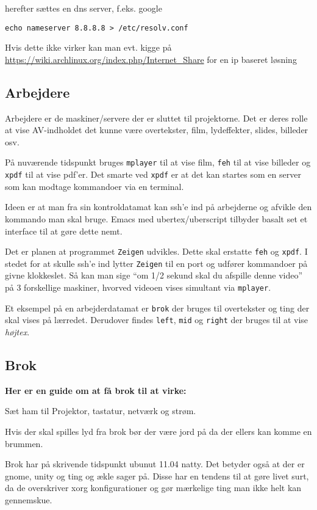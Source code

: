 \documentclass[10pt,a4paper,danish]{article}
\begin{document}
herefter sættes en dns server, f.eks. google
\begin{verbatim}
echo nameserver 8.8.8.8 > /etc/resolv.conf
\end{verbatim}

Hvis dette ikke virker kan man evt. kigge på
\url{https://wiki.archlinux.org/index.php/Internet_Share} for en ip baseret løsning


\subsection{Arbejdere}
Arbejdere er de maskiner/servere der er sluttet til projektorne. Det er deres
rolle at vise AV-indholdet det kunne være overtekster, film, lydeffekter,
slides, billeder osv.

På nuværende tidspunkt bruges \texttt{mplayer} til at vise film, \texttt{feh}
til at vise billeder og \texttt{xpdf} til at vise pdf'er.
Det smarte ved \texttt{xpdf} er at det kan startes som en server som kan modtage
kommandoer via en terminal.

Ideen er at man fra sin kontroldatamat kan ssh'e ind på arbejderne og afvikle
den kommando man skal bruge. Emacs med ubertex/uberscript tilbyder basalt set et
interface til at gøre dette nemt.

Det er planen at programmet \texttt{Zeigen} udvikles.
Dette skal erstatte \texttt{feh} og \texttt{xpdf}.
I stedet for at skulle ssh'e ind lytter \texttt{Zeigen} til en port og udfører
kommandoer på givne klokkeslet. Så kan man sige ``om 1/2 sekund skal du afspille
denne video'' på 3 forskellige maskiner, hvorved videoen vises simultant via
\texttt{mplayer}.


Et eksempel på en arbejderdatamat er \texttt{brok} der bruges til overtekster og ting der
skal vises på lærredet.
Derudover findes \texttt{left}, \texttt{mid} og \texttt{right} der bruges til at vise \textit{højtex}.


\subsection{Brok}
\textbf{Her er en guide om at få brok til at virke:}

Sæt ham til
Projektor, tastatur, netværk og strøm.

Hvis der skal spilles lyd fra brok bør der være jord på da der ellers kan komme
en brummen.

Brok har på skrivende tidspunkt ubunut 11.04 natty.
Det betyder også at der er gnome, unity og ting og ækle sager på.
Disse har en tendens til at gøre livet surt, da de overskriver xorg
konfigurationer og gør mærkelige ting man ikke helt kan gennemskue.
\end{document}
